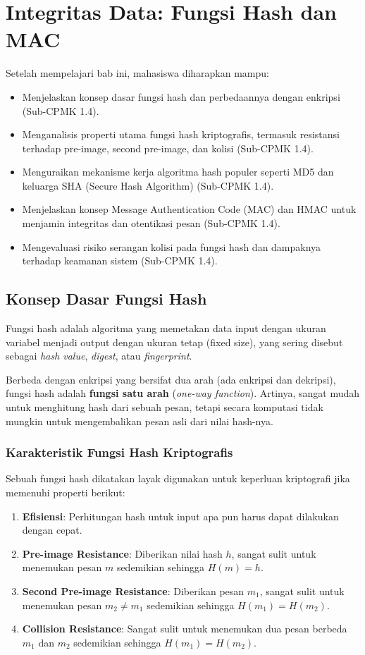 \documentclass[../main.tex]{subfiles}
\begin{document}
\chapter{Integritas Data: Fungsi Hash dan MAC}

\begin{learningoutcome}
Setelah mempelajari bab ini, mahasiswa diharapkan mampu:
\begin{itemize}
    \item Menjelaskan konsep dasar fungsi hash dan perbedaannya dengan enkripsi (Sub-CPMK 1.4).
    \item Menganalisis properti utama fungsi hash kriptografis, termasuk resistansi terhadap pre-image, second pre-image, dan kolisi (Sub-CPMK 1.4).
    \item Menguraikan mekanisme kerja algoritma hash populer seperti MD5 dan keluarga SHA (Secure Hash Algorithm) (Sub-CPMK 1.4).
    \item Menjelaskan konsep Message Authentication Code (MAC) dan HMAC untuk menjamin integritas dan otentikasi pesan (Sub-CPMK 1.4).
    \item Mengevaluasi risiko serangan kolisi pada fungsi hash dan dampaknya terhadap keamanan sistem (Sub-CPMK 1.4).
\end{itemize}
\end{learningoutcome}

\section{Konsep Dasar Fungsi Hash}
Fungsi hash adalah algoritma yang memetakan data input dengan ukuran variabel menjadi output dengan ukuran tetap (fixed size), yang sering disebut sebagai \textit{hash value}, \textit{digest}, atau \textit{fingerprint}.

Berbeda dengan enkripsi yang bersifat dua arah (ada enkripsi dan dekripsi), fungsi hash adalah \textbf{fungsi satu arah} (\textit{one-way function}). Artinya, sangat mudah untuk menghitung hash dari sebuah pesan, tetapi secara komputasi tidak mungkin untuk mengembalikan pesan asli dari nilai hash-nya.

\subsection{Karakteristik Fungsi Hash Kriptografis}
Sebuah fungsi hash dikatakan layak digunakan untuk keperluan kriptografi jika memenuhi properti berikut:
\begin{enumerate}
    \item \textbf{Efisiensi}: Perhitungan hash untuk input apa pun harus dapat dilakukan dengan cepat.
    \item \textbf{Pre-image Resistance}: Diberikan nilai hash $h$, sangat sulit untuk menemukan pesan $m$ sedemikian sehingga $H(m) = h$.
    \item \textbf{Second Pre-image Resistance}: Diberikan pesan $m_1$, sangat sulit untuk menemukan pesan $m_2 \neq m_1$ sedemikian sehingga $H(m_1) = H(m_2)$.
    \item \textbf{Collision Resistance}: Sangat sulit untuk menemukan dua pesan berbeda $m_1$ dan $m_2$ sedemikian sehingga $H(m_1) = H(m_2)$.
\end{enumerate}
\end{document}
